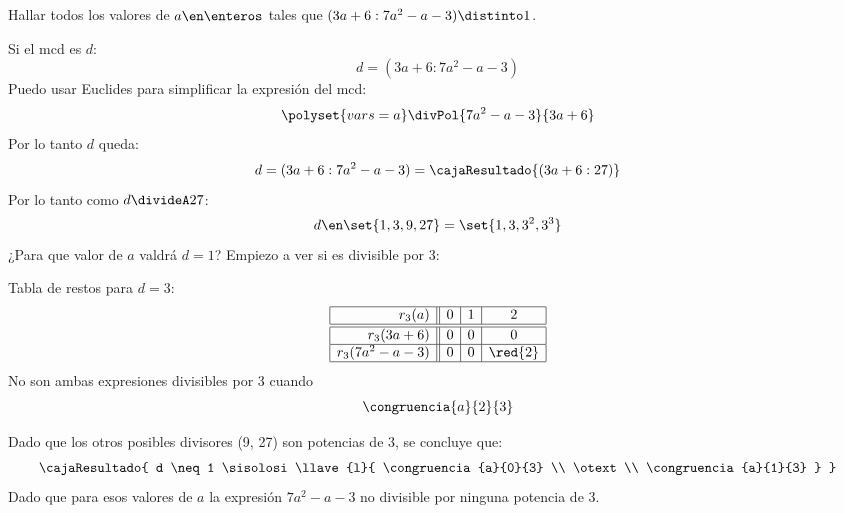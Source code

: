 \begin{enunciado}{\ejExtra}
  Hallar todos los valores de $a \en \enteros$ tales que $(3a+6 : 7a^2 - a -3) \distinto 1$.
\end{enunciado}
Si el mcd es $d$:
$$
  d = (3a+6 : 7a^2 - a -3)
$$
Puedo usar Euclides para simplificar la expresión del mcd:
$$
  \polyset{vars=a}
  \divPol{7a^2-a-3}{3a+6}
$$
Por lo tanto $d$ queda:
$$
  d = (3a+6 : 7a^2 - a -3) =
  \cajaResultado{(3a + 6 : 27)}
$$
Por lo tanto como $d \divideA 27$:
$$
  d \en \set{1,3,9,27} = \set{1,3,3^2, 3^3}
$$
¿Para que valor de $a$ valdrá  $d=1$? Empiezo a ver si es divisible por 3:

Tabla de restos para $d = 3$:
$$
  \begin{array}{|r||c|c|c|}
    \hline
    r_3(a)            & 0 & 1 & 2       \\ \hline\hline
    r_3(3a+6)         & 0 & 0 & 0       \\ \hline
    r_3(7a^2 - a - 3) & 0 & 0 & \red{2} \\ \hline
  \end{array}
$$
No son ambas expresiones divisibles por 3 cuando
$$
  \congruencia{a}{2}{3}
$$

Dado que los otros posibles divisores (9, 27) son potencias de 3, se concluye que:
$$
  \cajaResultado{
    d \neq 1
    \sisolosi
    \llave{l}{
      \congruencia{a}{0}{3} \\
      \otext                \\
      \congruencia{a}{1}{3}
    }
  }
$$
Dado que para esos valores de $a$ la expresión $7a^2-a-3$ no divisible por ninguna potencia de 3.

\begin{aportes}
  \item {}
  \item {}
\end{aportes}
